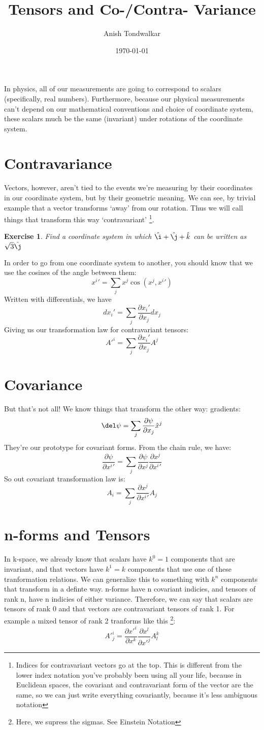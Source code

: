 \documentclass[11pt,notitlepage]{article}
\title{Tensors and Co-/Contra- Variance}
\author{Anish Tondwalkar}
\date{\today}
\newtheorem{exc}{Exercise}[section]
\begin{document}
\maketitle
In physics, all of our measurements are going to correspond to scalars (specifically, real numbers). 
Furthermore, because our physical measurements can't depend on our mathematical conventions and choice of coordinate system,
these scalars much be the same (invariant) under rotations of the coordinate system.
\section{Contravariance}
Vectors, however, aren't tied to the events we're measuring by their coordinates in our coordinate system, but by their geometric meaning.
We can see, by trivial example that a vector transforms `away' from our rotation. 
Thus we will call things that transform this way `contravariant'
\footnote{Indices for contravariant vectors go at the top. This is different from the lower index notation you've probably been using all your life, because in Euclidean spaces, the covariant and contravariant form of the vector are the same, so we can just write everything covariantly, because it's less ambiguous notation}. 
\begin{exc}
Find a coordinate system in which
$\hat\i + \hat\j + \hat k$
 can be written as $\sqrt3 \hat\j$
\end{exc}
In order to go from one coordinate system to another, you should know that we use the cosines of the angle between them:
$$ x^i' = \sum_j x^j \cos(x^j,x^i') $$
Written with differentials, we have
$$ dx_i' = \sum_j \frac{\partial x_i'}{\partial x_j} dx_j $$
Giving us our transformation law for contravariant tensors:
$$ A'^i = \sum_j \frac{\partial x_i'}{\partial x_j} A^j $$
\section{Covariance}
But that's not all! We know things that transform the other way: gradients:
$$ \del \psi = \sum_j \frac{\partial \psi}{\partial x_j} \hat x^j $$
 They're our prototype for covariant forms. 
From the chain rule, we have: 
$$\frac{\partial \psi}{\partial x^i'} = \sum_j \frac{\partial \psi}{\partial x^j} \frac{\partial x^j}{\partial x^i'} $$
So out covariant transformation law is:
$$ A_i = \sum_j \frac{\partial x^j}{\partial x^i'} A_j$$

\section{n-forms and Tensors}
In k-space, we already know that scalars have $k^0=1$ components that are invariant, and that vectors have $k^1=k$ components that use one of these tranformation relations. We can generalize this to something with $k^n$ components that transform in a definte way. n-forms have n covariant indicies, and tensors of rank n, have n indicies of either variance. Therefore, we can say that scalars are tensors of rank 0 and that vectors are contravariant tensors of rank 1. For example a mixed tensor of rank 2 tranforms like this \footnote{Here, we supress the sigmas. See Einstein Notation}:
$$A'^i_j =  \frac{\partial x'^i}{\partial x^k}\frac{\partial x^l}{\partial x'^j} A^k_l $$
\end{document}
